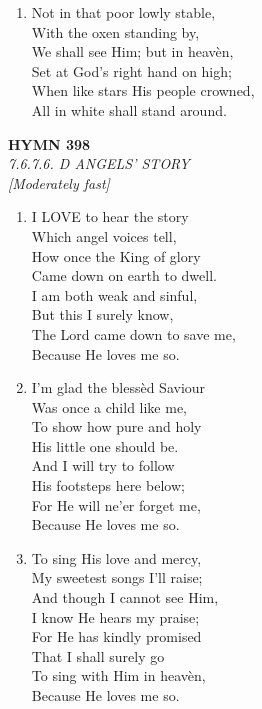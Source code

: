 \begin{enumerate}
    \item Not in that poor lowly stable, \\
        With the oxen standing by, \\
        We shall see Him; but in heav\`en, \\
        Set at God's right hand on high; \\
        When like stars His people crowned, \\
        All in white shall stand around.

\end{enumerate}

\newpage
\begin{center}
    {\Large \textbf{HYMN 398}}
    \\
    \textit{7.6.7.6. D ANGELS' STORY}
    \\
    \textit{\small [Moderately fast]}
\end{center}
\vspace{1em}

\begin{enumerate}
    \item I LOVE to hear the story \\
        Which angel voices tell, \\
        How once the King of glory \\
        Came down on earth to dwell. \\
        I am both weak and sinful, \\
        But this I surely know, \\
        The Lord came down to save me, \\
        Because He loves me so.

    \item I'm glad the bless\`ed Saviour \\
        Was once a child like me, \\
        To show how pure and holy \\
        His little one should be. \\
        And I will try to follow \\
        His footsteps here below; \\
        For He will ne'er forget me, \\
        Because He loves me so.

    \item To sing His love and mercy, \\
        My sweetest songs I'll raise; \\
        And though I cannot see Him, \\
        I know He hears my praise; \\
        For He has kindly promised \\
        That I shall surely go \\
        To sing with Him in heav\`en, \\
        Because He loves me so.

\end{enumerate}

